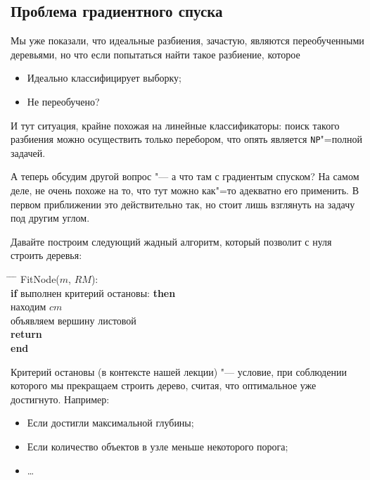 \subsection*{Проблема градиентного спуска}

Мы уже показали, что идеальные разбиения, зачастую, являются переобученными деревьями, но что если попытаться найти такое разбиение, которое
\begin{itemize}
    \item Идеально классифицирует выборку;
    \item Не переобучено?
\end{itemize}

И тут ситуация, крайне похожая на линейные классификаторы: поиск такого разбиения можно осуществить только перебором, что опять является \texttt{NP}"=полной задачей.

А теперь обсудим другой вопрос "--- а что там с градиентым спуском? На самом деле, не очень похоже на то, что тут можно как"=то адекватно его применить. В первом приближении это действительно так, но стоит лишь взглянуть на задачу под другим углом.

Давайте построим следующий жадный алгоритм, который позволит с нуля строить деревья:
\begin{algorithm}
\begin{tabbing}
\hspace{0.3cm} \= \hspace{0.6cm} \= \hspace{0.9cm} \= \kill
FitNode($m$, $RM$): \\
\> \textbf{if} выполнен критерий остановы: \textbf{then} \\
\> \> находим $cm$ \\
\> \> объявляем вершину листовой \\
\> \> \textbf{return} \\
\> \textbf{end}
\end{tabbing}
\end{algorithm}

Критерий остановы (в контексте нашей лекции) "--- условие, при соблюдении которого мы прекращаем строить дерево, считая, что оптимальное уже достигнуто. Например:
\begin{itemize}
    \item Если достигли максимальной глубины;
    \item Если количество объектов в узле меньше некоторого порога;
    \item \dots
\end{itemize}

